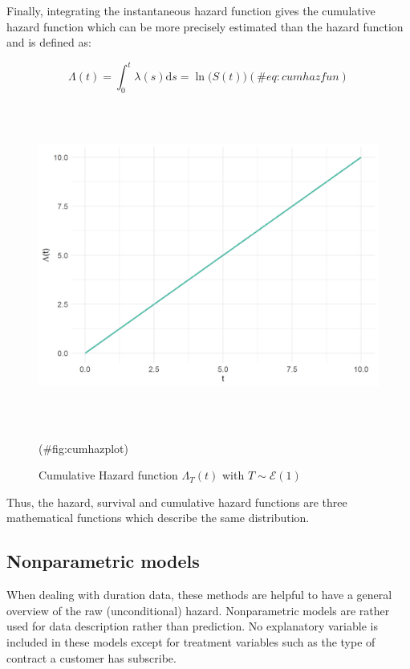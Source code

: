\documentclass[
]{book}
\begin{document}
Finally, integrating the instantaneous hazard function gives the cumulative hazard function which can be more precisely estimated than the hazard function \citep{CAMERON_TRIVEDI} and is defined as:

\begin{equation}
  \Lambda (t) = \int_{0}^{t} \lambda(s) \text{d}s = \ln \big(S(t)\big)
  (\#eq:cumhazfun)
\end{equation}

\begin{figure}

{\centering \includegraphics[width=400pt,height=300pt]{./imgs/cum_haz_plot} 

}

\caption{Cumulative Hazard function $\Lambda_T(t)$ with $T \sim \mathcal{E} (1)$}(\#fig:cumhazplot)
\end{figure}

Thus, the hazard, survival and cumulative hazard functions are three mathematical functions which describe the same distribution.

\hypertarget{nonparametric-models}{%
\subsection{Nonparametric models}\label{nonparametric-models}}

When dealing with duration data, these methods are helpful to have a general overview of the raw (unconditional) hazard. Nonparametric models are rather used for data description rather than prediction. No explanatory variable is included in these models except for treatment variables such as the type of contract a customer has subscribe.
\end{document}
